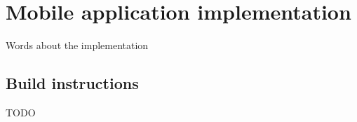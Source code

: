 \chapter{Mobile application implementation}

Words about the implementation

\section{Build instructions}
TODO